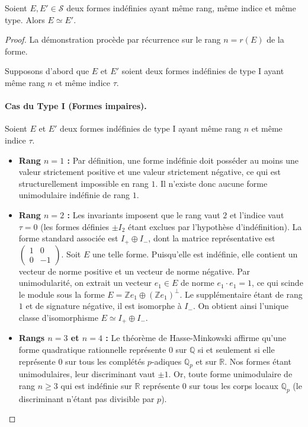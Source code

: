 \begin{theorem}
\label{thm:class_indef}
Soient $E, E' \in \mathcal{S}$ deux formes indéfinies ayant même rang, même indice et même type. Alors $E \simeq E'$.
\end{theorem}
\begin{proof}
La démonstration procède par récurrence sur le rang $n = r(E)$ de la forme.

Supposons d'abord que $E$ et $E'$ soient deux formes indéfinies de type I ayant même rang $n$ et même indice $\tau$.

\paragraph{Cas du Type I (Formes impaires).}
Soient $E$ et $E'$ deux formes indéfinies de type I ayant même rang $n$ et même indice $\tau$.
\begin{itemize}
    \item \textbf{Rang $n = 1$ :} Par définition, une forme indéfinie doit posséder au moins une valeur strictement positive et une valeur strictement négative, ce qui est structurellement impossible en rang $1$. Il n'existe donc aucune forme unimodulaire indéfinie de rang $1$.
    
    \item \textbf{Rang $n = 2$ :} Les invariants imposent que le rang vaut $2$ et l'indice vaut $\tau = 0$ (les formes définies $\pm I_2$ étant exclues par l'hypothèse d'indéfinition). La forme standard associée est $I_+ \oplus I_-$, dont la matrice représentative est $\begin{pmatrix} 1 & 0 \\ 0 & -1 \end{pmatrix}$. Soit $E$ une telle forme. Puisqu'elle est indéfinie, elle contient un vecteur de norme positive et un vecteur de norme négative. Par unimodularité, on extrait un vecteur $e_1 \in E$ de norme $e_1 \cdot e_1 = 1$, ce qui scinde le module sous la forme $E = \mathbb{Z}e_1 \oplus (\mathbb{Z}e_1)^\perp$. Le supplémentaire étant de rang $1$ et de signature négative, il est isomorphe à $I_-$. On obtient ainsi l'unique classe d'isomorphisme $E \simeq I_+ \oplus I_-$.
    
    \item \textbf{Rangs $n = 3$ et $n = 4$ :} Le théorème de Hasse-Minkowski affirme qu'une forme quadratique rationnelle représente $0$ sur $\mathbb{Q}$ si et seulement si elle représente $0$ sur tous les complétés $p$-adiques $\mathbb{Q}_p$ et sur $\mathbb{R}$. Nos formes étant unimodulaires, leur discriminant vaut $\pm 1$. Or, toute forme unimodulaire de rang $n \ge 3$ qui est indéfinie sur $\mathbb{R}$ représente $0$ sur tous les corps locaux $\mathbb{Q}_p$ (le discriminant n'étant pas divisible par $p$).
    

\end{itemize}
\end{proof}
